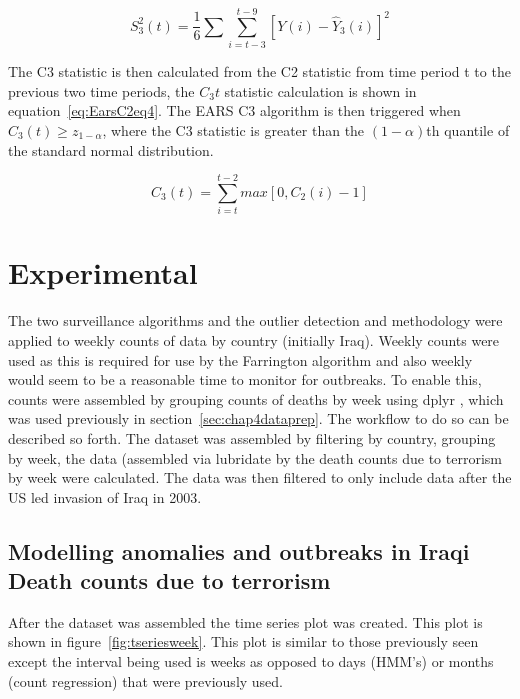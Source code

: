 \begin{equation} 
S^{2}_{3}(t)=\frac{1}{6}\sum \sum_{i=t-3}^{t-9}[Y(i)-\hat{Y}_{3}(i)]^{2}
\label{eq:EarsC2eq3}  \end{equation}

The C3 statistic is then calculated from the C2 statistic from time period t to the previous two time periods, the $C_{3}t$ statistic calculation is shown in equation~\ref{eq:EarsC2eq4}. The EARS C3 algorithm is then triggered when $C_3(t) \geq z_{1-\alpha}$, where the C3 statistic is greater than the $(1-\alpha)$th quantile of the standard normal distribution.

\begin{equation} 
C_{3}(t)=\sum_{i=t}^{t-2}max[0,C_{2}(i)-1]
\label{eq:EarsC2eq4}  \end{equation}

\section{Experimental}
The two surveillance algorithms and the outlier detection and methodology were applied to weekly counts of data by country (initially Iraq). Weekly counts were used as this is required for use by the Farrington algorithm and also weekly would seem to be a reasonable time to monitor for outbreaks. To enable this, counts were assembled by grouping counts of deaths by week using dplyr \citep{wickham2015dplyr}, which was used previously in section~\ref{sec:chap4dataprep}. The workflow to do so can be described so forth. The dataset was assembled by filtering by country, grouping by week, the data (assembled via lubridate by \citep{grolemund2011dates} the death counts due to terrorism by week were calculated. The data was then filtered to only include data after the US led invasion of Iraq in 2003.

\subsection{Modelling anomalies and outbreaks in Iraqi Death counts due to terrorism}

After the dataset was assembled the time series plot was created. This plot is shown in figure~\ref{fig:tseriesweek}. This plot is similar to those previously seen except the interval being used is weeks as opposed to days (HMM's) or months (count regression) that were previously used.

